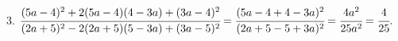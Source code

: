 3. $\cfrac{(5a-4)^2+2(5a-4)(4-3a)+(3a-4)^2}{(2a+5)^2-2(2a+5)(5-3a)+(3a-5)^2}=
\cfrac{(5a-4+4-3a)^2}{(2a+5-5+3a)^2}=\cfrac{4a^2}{25a^2}=\cfrac{4}{25}.$\\
